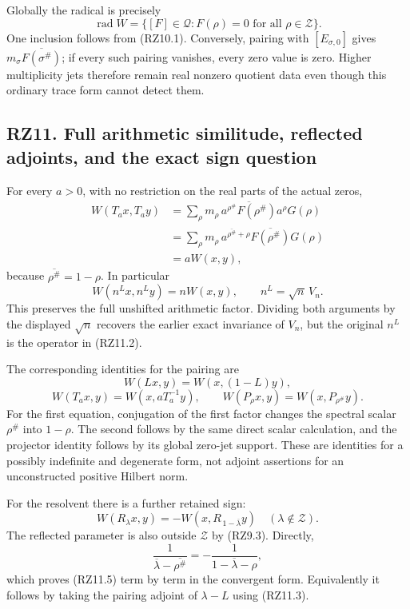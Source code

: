 \documentclass[
]{article}
\begin{document}
Globally the radical is precisely \[
\operatorname{rad}W
=
\{[F]\in\mathcal Q:F(\rho)=0\text{ for all }\rho\in\mathscr Z\}.
\tag{RZ10.8}
\] One inclusion follows from (RZ10.1). Conversely, pairing with
\([E_{\sigma,0}]\) gives \(m_\sigma\overline{F(\sigma^\#)}\); if every
such pairing vanishes, every zero value is zero. Higher multiplicity
jets therefore remain real nonzero quotient data even though this
ordinary trace form cannot detect them.

\subsection{RZ11. Full arithmetic similitude, reflected adjoints, and
the exact sign
question}\label{rz11.-full-arithmetic-similitude-reflected-adjoints-and-the-exact-sign-question}

For every \(a>0\), with no restriction on the real parts of the actual
zeros, \[
\begin{aligned}
W(T_ax,T_ay)
&=\sum_\rho m_\rho\,
\overline{a^{\rho^\#}F(\rho^\#)}
a^\rho G(\rho)\\
&=\sum_\rho m_\rho\,a^{\overline{\rho^\#}+\rho}
\overline{F(\rho^\#)}G(\rho)\\
&=aW(x,y),
\end{aligned}
\tag{RZ11.1}
\] because \(\overline{\rho^\#}=1-\rho\). In particular \[
\boxed{W(n^Lx,n^Ly)=nW(x,y),\qquad n^L=\sqrt n\,V_n.}
\tag{RZ11.2}
\] This preserves the full unshifted arithmetic factor. Dividing both
arguments by the displayed \(\sqrt n\) recovers the earlier exact
invariance of \(V_n\), but the original \(n^L\) is the operator in
(RZ11.2).

The corresponding identities for the pairing are \[
W(Lx,y)=W(x,(1-L)y),
\tag{RZ11.3}
\] \[
W(T_ax,y)=W(x,aT_a^{-1}y),
\qquad
W(P_\rho x,y)=W(x,P_{\rho^\#}y).
\tag{RZ11.4}
\] For the first equation, conjugation of the first factor changes the
spectral scalar \(\rho^\#\) into \(1-\rho\). The second follows by the
same direct scalar calculation, and the projector identity follows by
its global zero-jet support. These are identities for a possibly
indefinite and degenerate form, not adjoint assertions for an
unconstructed positive Hilbert norm.

For the resolvent there is a further retained sign: \[
W(R_\lambda x,y)
=-W(x,R_{\,1-\overline\lambda}y)
\quad(\lambda\notin\mathscr Z).
\tag{RZ11.5}
\] The reflected parameter is also outside \(\mathscr Z\) by (RZ9.3).
Directly, \[
\frac1{\overline\lambda-\overline{\rho^\#}}
=-\frac1{1-\overline\lambda-\rho},
\] which proves (RZ11.5) term by term in the convergent form.
Equivalently it follows by taking the pairing adjoint of \(\lambda-L\)
using (RZ11.3).
\end{document}
